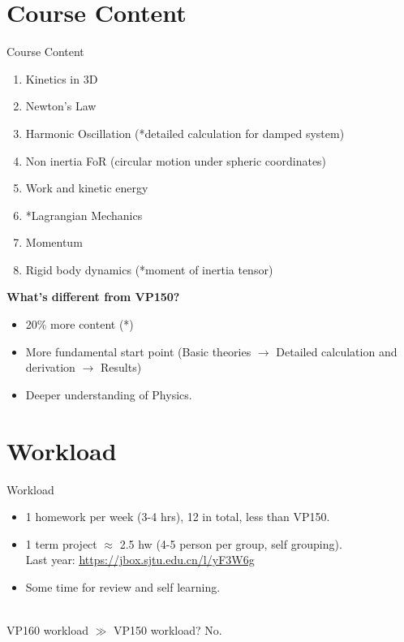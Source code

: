 \documentclass{beamer}
\begin{document}
\section{Course Content}
\begin{frame}{Course Content}
    \begin{enumerate}
        \item Kinetics in 3D
        \item Newton's Law
        \item Harmonic Oscillation (*detailed calculation for damped system)
        \item Non inertia FoR (circular motion under spheric coordinates)
        \item Work and kinetic energy
        \item *Lagrangian Mechanics
        \item Momentum
        \item Rigid body dynamics (*moment of inertia tensor)
    \end{enumerate}
    \textbf{What's different from VP150?}\\
    \begin{itemize}
      \item 20\% more content (*)
      \item More fundamental start point (Basic theories $\to$ Detailed calculation and derivation $\to$ Results)
      \item Deeper understanding of Physics.
    \end{itemize}
\end{frame}

\section{Workload}
\begin{frame}{Workload}
  \begin{itemize}
    \item 1 homework per week (3-4 hrs), 12 in total, less than VP150.
    \item 1 term project $\approx $ 2.5 hw (4-5 person per group, self grouping).\\Last year: \underline{\small{\url{https://jbox.sjtu.edu.cn/l/yF3W6g}}}
    \item Some time for review and self learning.
  \end{itemize}
  ~\\
  \centering
  VP160 workload $\gg $ VP150 workload? No.
  \end{frame}
\end{document}
